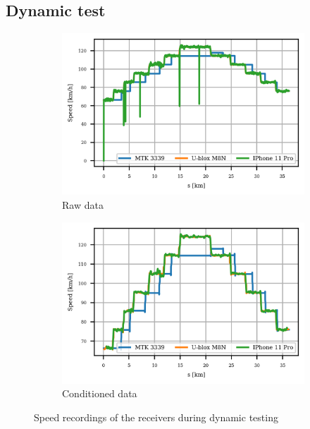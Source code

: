 \documentclass{article}
\begin{document}
		\subsection{Dynamic test}
			\begin{figure}[h]
		   		\centering
		     	\begin{subfigure}[b]{0.45\textwidth}
		      		\centering
		      	  	\includegraphics[width=\textwidth]{Dynamic/raw_speed.png}
		      	  	\caption{Raw data}
		     	\end{subfigure}
		     	\begin{subfigure}[b]{0.45\textwidth}
		      	   \centering
		      	   \includegraphics[width=\textwidth]{Dynamic/cond_speed.png}
		      	   \caption{Conditioned data}
		     	\end{subfigure}
		     	
		      \caption{Speed recordings of the receivers during dynamic testing}
		      \label{fig:dynamic_speed}
			\end{figure}		
\end{document}
